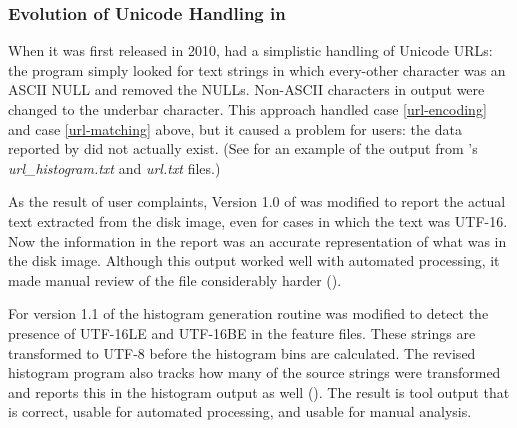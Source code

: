 \subsubsection{Evolution of Unicode Handling in \be}
When it was first released in 2010, \be had a simplistic handling of
Unicode URLs: the program simply looked for text strings in which
every-other character was an ASCII NULL and removed the
NULLs. Non-ASCII characters in output were changed to the underbar
character. This approach handled case \ref{url-encoding} and case
\ref{url-matching} above, but it caused a problem for users: the data
reported by \be did not actually exist. (See
 for an example of the output from \be's
  \emph{url\_histogram.txt} and \emph{url.txt} files.)

As the result of user complaints, Version 1.0 of \be was modified to
report the actual text extracted from the disk image, even for cases
in which the text was UTF-16. Now the information in the \be report
was an accurate representation of what was in the disk
image. Although this output worked well with automated processing, it
made  manual review of the file considerably harder ().

For version 1.1 of \be the histogram generation routine was modified
to detect the presence of UTF-16LE and UTF-16BE in the feature
files. These strings are transformed to UTF-8 before the histogram
bins are calculated. The revised histogram program also tracks how
many of the source strings were transformed and reports this in the
histogram output as well (). The result is
tool output that is correct, usable for automated processing, and
usable for manual analysis.


